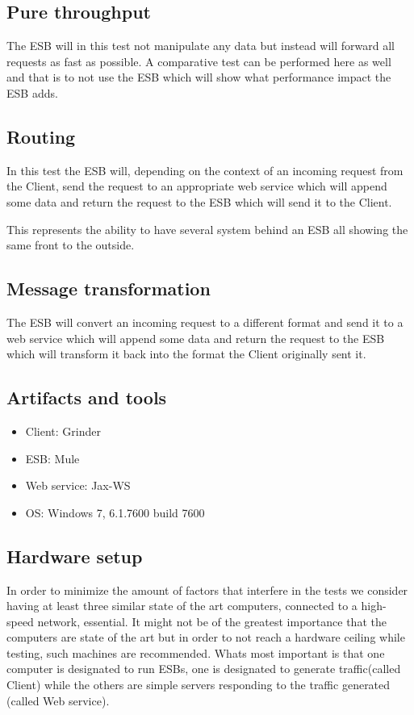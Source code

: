 
\subsection{Pure throughput}
The ESB will in this test not manipulate any data but instead will forward all requests as fast as possible. 
A comparative test can be performed here as well and that is to not use the ESB which will show what performance impact the ESB adds. 


\subsection{Routing}
In this test the ESB will, depending on the context of an incoming request from the Client, send the request to an appropriate web service which will append some data and return the request to the ESB which will send it to the Client.

This represents the ability to have several system behind an ESB all showing the same front to the outside.

\subsection{Message transformation}
The ESB will convert an incoming request to a different format and send it to a web service which will append some data and return the request to the ESB which will transform it back into the format the Client originally sent it.

\subsection{Artifacts and tools}
\begin{itemize}
	\item Client: Grinder \cite{whatisgrinder, kod}
	\item ESB: Mule \cite{whatismule, kod}
	\item Web service: Jax-WS \cite{whatisjaxws, kod}
	\item OS: Windows 7, 6.1.7600 build 7600
\end{itemize}

\subsection{Hardware setup}
 In order to minimize the amount of factors that interfere in the tests we consider having at least three similar state of the art computers, connected to a high-speed network, essential.
It might not be of the greatest importance that the computers are state of the art but in order to not reach a hardware ceiling while testing, such machines are recommended. Whats most important is that one computer is designated to run ESBs, one is designated to generate traffic(called Client) while the others are simple servers responding to the traffic generated (called Web service). 


